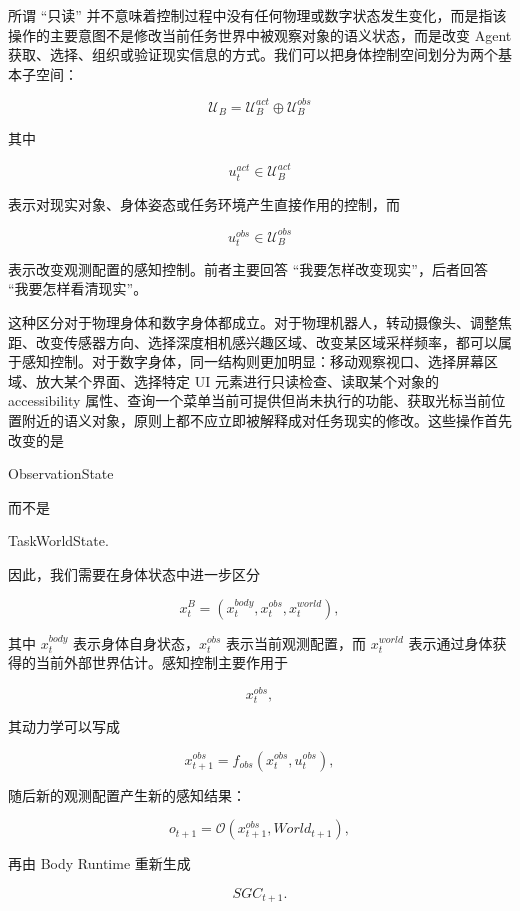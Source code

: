 所谓 ``只读'' 并不意味着控制过程中没有任何物理或数字状态发生变化，而是指该操作的主要意图不是修改当前任务世界中被观察对象的语义状态，而是改变 Agent 获取、选择、组织或验证现实信息的方式。我们可以把身体控制空间划分为两个基本子空间：

\[
\boxed{
\mathcal U_B
=
\mathcal U_B^{act}
\oplus
\mathcal U_B^{obs}
}
\]

其中

\[
u_t^{act}
\in
\mathcal U_B^{act}
\]

表示对现实对象、身体姿态或任务环境产生直接作用的控制，而

\[
u_t^{obs}
\in
\mathcal U_B^{obs}
\]

表示改变观测配置的感知控制。前者主要回答 ``我要怎样改变现实''，后者回答 ``我要怎样看清现实''。

这种区分对于物理身体和数字身体都成立。对于物理机器人，转动摄像头、调整焦距、改变传感器方向、选择深度相机感兴趣区域、改变某区域采样频率，都可以属于感知控制。对于数字身体，同一结构则更加明显：移动观察视口、选择屏幕区域、放大某个界面、选择特定 UI 元素进行只读检查、读取某个对象的 accessibility 属性、查询一个菜单当前可提供但尚未执行的功能、获取光标当前位置附近的语义对象，原则上都不应立即被解释成对任务现实的修改。这些操作首先改变的是

\begin{statementbox}
ObservationState
\end{statementbox}

而不是

\begin{statementbox}
TaskWorldState.
\end{statementbox}

因此，我们需要在身体状态中进一步区分

\[
x_t^B
=
\left(
x_t^{body},
x_t^{obs},
x_t^{world}
\right),
\]

其中 $x_t^{body}$ 表示身体自身状态，$x_t^{obs}$ 表示当前观测配置，而 $x_t^{world}$ 表示通过身体获得的当前外部世界估计。感知控制主要作用于

\[
x_t^{obs},
\]

其动力学可以写成

\[
x_{t+1}^{obs}
=
f_{obs}
\left(
x_t^{obs},
u_t^{obs}
\right),
\]

随后新的观测配置产生新的感知结果：

\[
o_{t+1}
=
\mathcal O
\left(
x_{t+1}^{obs},
World_{t+1}
\right),
\]

再由 Body Runtime 重新生成

\[
SGC_{t+1}.
\]

